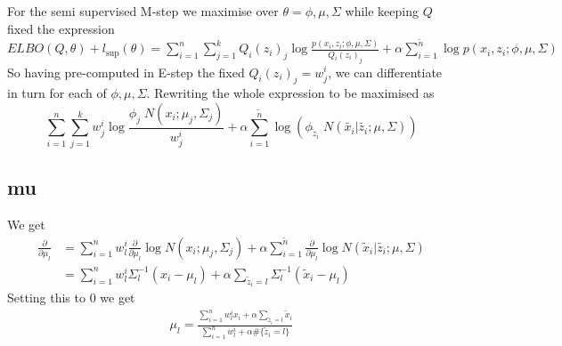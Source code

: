 

\begin{answer}
For the semi supervised M-step we maximise over $\theta = \phi, \mu, \Sigma$ while keeping $Q$ fixed the expression $ELBO(Q, \theta) + l_{\text{sup}}(\theta) = \sum_{i=1}^n \sum_{j=1}^k Q_i(z_i)_j \log \frac{p(x_i,z_i; \phi, \mu, \Sigma)}{Q_i(z_i)_j} + \alpha \sum_{i=1}^{\tilde{n}} \log p(x_i, z_i; \phi, \mu, \Sigma)$
\linebreak
So having pre-computed in E-step the fixed $Q_i(z_i)_j = w^i_j$, we can differentiate in turn for each of $\phi, \mu, \Sigma$. Rewriting the whole expression to be maximised as
\begin{equation*}
\sum_{i=1}^n \sum_{j=1}^k w^i_j \log \frac{\phi_j \; N(x_i ; \mu_j, \Sigma_j)}{w^i_j} + \alpha \sum_{i=1}^{\tilde{n}} \log  \left ( \phi_{\tilde{z}_i} \; N(\tilde{x_i} | \tilde{z_i}; \mu, \Sigma) \right )
\end{equation*}
\subsection*{mu}
We get
\begin{align*}
\frac{\partial}{\partial \mu_l} &=
\sum_{i=1}^n w^i_l \frac{\partial}{\partial \mu_l} \log  N(x_i ; \mu_j, \Sigma_j) +
\alpha \sum_{i=1}^{\tilde{n}} \frac{\partial}{\partial \mu_l} \log N(\tilde{x}_i | \tilde{z_i}; \mu, \Sigma)
\\
&= \sum_{i=1}^n w^i_l \Sigma_l^{-1} (x_i - \mu_l) + 
\alpha \sum_{\tilde{z}_i = l} \Sigma_l^{-1} (\tilde{x}_i - \mu_l)
\end{align*}
Setting this to $0$ we get
\begin{align*}
\mu_l =
\frac{
	\sum_{i=1}^n w^i_l x_i + \alpha \sum_{\tilde{z}_i = l} \tilde{x}_i
}
{
	\sum_{i=1}^n w^i_l + \alpha \#\{\tilde{z}_i = l\}
}
\end{align*}

\end{answer}
